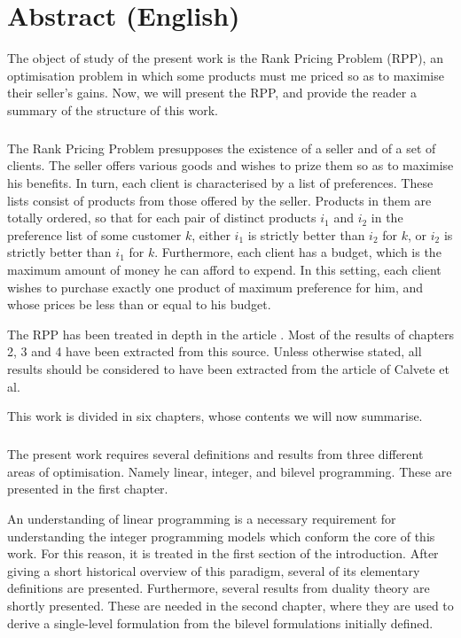 \chapter*{Abstract (English)} %

The object of study of the present work is the Rank Pricing Problem (RPP), an
optimisation problem in which some products must me priced so as to maximise
their seller's gains. Now, we will present the RPP, and provide the reader a
summary of the structure of this work.

\paragraph*{}

The Rank Pricing Problem presupposes the existence of a seller and of a set of
clients. The seller offers various goods and wishes to prize them so as to
maximise his benefits. In turn, each client is characterised by a list of
preferences. These lists consist of products from those offered by the seller.
Products in them are totally ordered, so that for each pair of distinct products
$i_1$ and $i_2$ in the preference list of some customer $k$, either $i_1$ is
strictly better than $i_2$ for $k$, or $i_2$ is strictly better than $i_1$ for
$k$.  Furthermore, each client has a budget, which is the maximum amount of
money he can afford to expend. In this setting, each client wishes to purchase
exactly one product of maximum preference for him, and whose prices be less than
or equal to his budget.

The RPP has been treated in depth in the article \cite{ca:rpp}. Most of the
results of chapters 2, 3 and 4 have been extracted from this source. Unless
otherwise stated, all results should be considered to have been extracted from
the article of Calvete et al.

This work is divided in six chapters, whose contents we will now summarise.

\paragraph*{}

The present work requires several definitions and results from three different
areas of optimisation. Namely linear, integer, and bilevel programming. These
are presented in the first chapter.

An understanding of linear programming is a necessary requirement for
understanding the integer programming models which conform the core of this
work. For this reason, it is treated in the first section of the introduction.
After giving a short historical overview of this paradigm, several of its
elementary definitions are presented. Furthermore, several results from duality
theory are shortly presented. These are needed in the second chapter, where they
are used to derive a single-level formulation from the bilevel formulations
initially defined.

